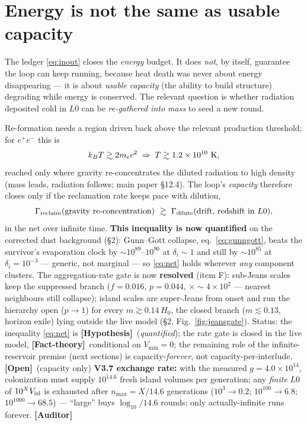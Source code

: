 \documentclass[11pt]{article}
\newcommand{\Hyp}{\textbf{\textcolor{blue!55!black}{[Hypothesis]}}}
\newcommand{\Open}{\textbf{\textcolor{gray!10!black}{[Open]}}}
\newcommand{\Auditor}{\textbf{\textcolor{teal!55!black}{[Auditor]}}}
\newcommand{\factth}{\textcolor{green!40!black}{\textbf{[Fact-theory]}}}
\begin{document}
\section{Energy is not the same as usable capacity}
The ledger \eqref{eq:inout} closes the \emph{energy} budget. It does \emph{not}, by itself, guarantee the loop can keep running, because heat death was never about energy disappearing --- it is about \emph{usable capacity} (the ability to build structure) degrading while energy is conserved. The relevant question is whether radiation deposited cold in $L0$ can be \emph{re-gathered into mass} to seed a new round.

Re-formation needs a region driven back above the relevant production threshold; for $e^+e^-$ this is
\begin{equation}
k_B T \gtrsim 2 m_e c^2 \;\Rightarrow\; T\gtrsim 1.2\times10^{10}\ {\rm K},
\label{eq:pair}
\end{equation}
reached only where gravity re-concentrates the diluted radiation to high density (mass leads, radiation follows; main paper \S12.4). The loop's \emph{capacity} therefore closes only if the reclamation rate keeps pace with dilution,
\begin{equation}
\Gamma_{\rm reclaim}(\text{gravity re-concentration})\ \gtrsim\ \Gamma_{\rm dilute}(\text{drift, redshift in }L0),
\label{eq:net}
\end{equation}
in the net over infinite time. \textbf{This inequality is now quantified} on the corrected dust background (\S2): Gunn--Gott collapse, eq.~\eqref{eq:gunngott}, beats the survivor's evaporation clock by $\sim\!10^{89}$--$10^{90}$ at $\delta_i\sim1$ and still by $\sim\!10^{85}$ at $\delta_i=10^{-3}$ --- generic, not marginal --- so \eqref{eq:net} holds wherever \emph{any} component clusters. The aggregation-rate gate is now \textbf{resolved} (item F): sub-Jeans scales keep the suppressed branch ($f=0.016$, $p=0.044$, $\times\!\sim\!4\times10^{2}$ --- nearest neighbours still collapse); island scales are super-Jeans from onset and run the hierarchy open ($p\to1$) for every $m\gtrsim0.14\,H_0$, the closed branch ($m\lesssim0.13$, horizon exile) lying outside the live model (\S2, Fig.~\ref{fig:jeansgate}). Status: the inequality \eqref{eq:net} is \Hyp\ (\emph{quantified}); the rate gate is closed in the live model, \factth\ conditional on $V_{\min}=0$; the remaining role of the infinite-reservoir premise (next sections) is capacity-\emph{forever}, not capacity-per-interlude. \Open\ (capacity only) \textbf{V3.7 exchange rate:} with the measured $g=4.0\times10^{14}$, colonization must supply $10^{14.6}$ fresh island volumes per generation; any \emph{finite} $L0$ of $10^{X}V_{\rm isl}$ is exhausted after $n_{\max}=X/14.6$ generations ($10^{3}\to0.2$; $10^{100}\to6.8$; $10^{1000}\to68.5$) --- ``large'' buys $\log_{10}/14.6$ rounds; only actually-infinite runs forever. \Auditor
\end{document}
